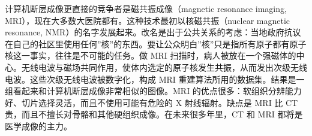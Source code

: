 计算机断层成像更直接的竞争者是磁共振成像（magnetic resonance imaging,
MRI），现在大多数大医院都有。这种技术最初以核磁共振（nuclear magnetic
resonance,
NMR）的名字发展起来。改名是出于公共关系的考虑：当地政府抗议在自己的社区里使用任何''核''的东西。要让公众明白''核''只是指所有原子都有原子核这一事实，往往是不可能的任务。做
MRI
扫描时，病人被放在一个强磁体的中心。无线电波与磁场共同作用，使体内选定的原子核发生共振，从而发出次级无线电波。这些次级无线电波被数字化，构成
MRI
重建算法所用的数据集。结果是一组看起来和计算机断层成像非常相似的图像。MRI
的优点很多：软组织分辨能力好、切片选择灵活，而且不使用可能有危险的 X
射线辐射。缺点是 MRI 比 CT
贵，而且不擅长对骨骼和其他硬组织成像。在未来很多年里，CT 和 MRI
都将是医学成像的主力。
